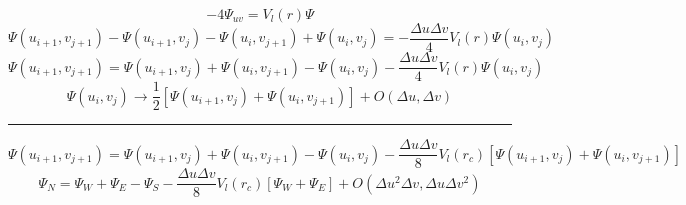 \documentclass[12pt]{article}
\begin{document}
\begin{equation*}
    -4\Psi_{uv}=V_l(r)\Psi
\end{equation*}
\begin{equation*}
    \Psi(u_{i+1},v_{j+1})-\Psi(u_{i+1},v_j)-\Psi(u_i,v_{j+1})+\Psi(u_i,v_j)=-\frac{\Delta u\Delta v}{4}V_l(r)\Psi(u_i,v_j)
\end{equation*}
\begin{equation*}
    \Psi(u_{i+1},v_{j+1})=\Psi(u_{i+1},v_j)+\Psi(u_i,v_{j+1})-\Psi(u_i,v_j)-\frac{\Delta u\Delta v}{4}V_l(r)\Psi(u_i,v_j)
\end{equation*}
\begin{equation*}
  \Psi(u_i,v_j)\rightarrow\frac{1}{2}\left[\Psi(u_{i+1},v_j)+\Psi(u_i,v_{j+1})\right]+O(\Delta u,\Delta v)
\end{equation*}
\noindent\rule{\textwidth}{1pt}
\begin{equation*}
    \Psi(u_{i+1},v_{j+1})=\Psi(u_{i+1},v_j)+\Psi(u_i,v_{j+1})-\Psi(u_i,v_j)-\frac{\Delta u\Delta v}{8}V_l(r_c)\left[\Psi(u_{i+1},v_j)+\Psi(u_i,v_{j+1})\right]
\end{equation*}
\begin{equation*}
    \boxed{\Psi_N=\Psi_W+\Psi_E-\Psi_S-\frac{\Delta u\Delta v}{8}V_l(r_c)\left[\Psi_W+\Psi_E\right]+O(\Delta u^2\Delta v,\Delta u\Delta v^2)}
\end{equation*}
\end{document}
